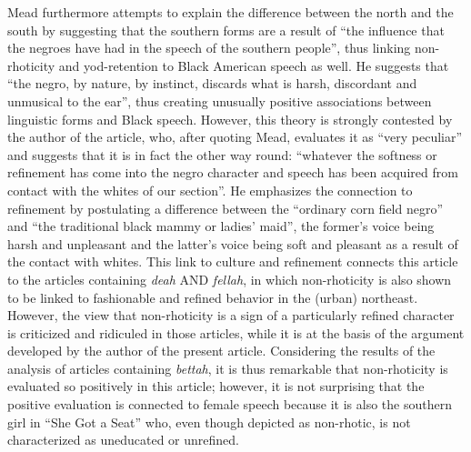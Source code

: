 Mead furthermore attempts to explain the difference between the north and the south by suggesting that the southern forms are a result of “the influence that the negroes have had in the speech of the southern people”, thus linking non-rhoticity and yod-retention to Black American speech as well. He suggests that “the negro, by nature, by instinct, discards what is harsh, discordant and unmusical to the ear”, thus creating unusually positive associations between linguistic forms and Black speech. However, this theory is strongly contested by the author of the article, who, after quoting Mead, evaluates it as “very peculiar” and suggests that it is in fact the other way round: “whatever the softness or refinement has come into the negro character and speech has been acquired from contact with the whites of our section”. He emphasizes the connection to refinement by postulating a difference between the “ordinary corn field negro” and “the traditional black mammy or ladies’ maid”, the former’s voice being harsh and unpleasant and the latter’s voice being soft and pleasant as a result of the contact with whites. This link to culture and refinement connects this article to the articles containing \emph{deah} AND \emph{fellah}, in which non-rhoticity is also shown to be linked to fashionable and refined behavior in the (urban) northeast. However, the view that non-rhoticity is a sign of a particularly refined character is criticized and ridiculed in those articles, while it is at the basis of the argument developed by the author of the present article. Considering the results of the analysis of articles containing \emph{bettah}, it is thus remarkable that non-rhoticity is evaluated so positively in this article; however, it is not surprising that the positive evaluation is connected to female speech because it is also the southern girl in “She Got a Seat” who, even though depicted as non-rhotic, is not characterized as uneducated or unrefined.

